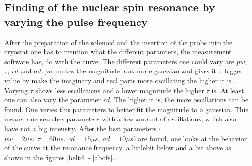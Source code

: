     \subsection{Finding of the nuclear spin resonance by varying the pulse frequency}
    \label{task_2}
    After the preparation of the solenoid and the insertion of the probe into the cryostat one has to mention what the different paramters, the measurement software has, do with the curve. The different parameters one could vary are $pw$, $\tau$, $rd$ and $ad$. $pw$ makes the magnitude look more gaussian and gives it a bigger value by make the imaginary and real parts more oscillating the higher it is. Varying $\tau$ shows less oscillations and a lower magnitude the higher $\tau$ is. At least one can also vary the parameter $rd$. The higher it is, the more oscillations can be found. One varies this parameters to better fit the magnitude to a gaussian. This means, one searches parameters with a low amount of oscillations, which also have not a big intensity. After the best parameters ($ pw=2\unit{\mu s},\ \tau = 60\unit{\mu s},\ rd = 15\unit{\mu s},\ ad=10\unit{\mu s} $) are found, one looks  at the behavior of the curve at the resonance frequency, a littlebit below and a bit above as shown in the figures \ref{beltd} - \ref{abofs}.
